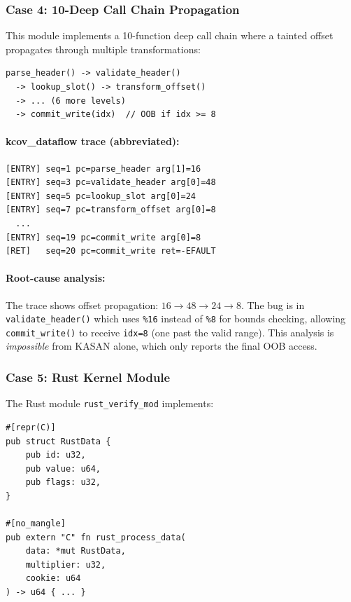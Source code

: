 \documentclass{ndss}
\begin{document}
\subsubsection{Case 4: 10-Deep Call Chain Propagation}

This module implements a 10-function deep call chain where a tainted offset
propagates through multiple transformations:
\begin{lstlisting}[numbers=none]
parse_header() -> validate_header()
  -> lookup_slot() -> transform_offset()
  -> ... (6 more levels)
  -> commit_write(idx)  // OOB if idx >= 8
\end{lstlisting}

\paragraph{kcov\_dataflow trace (abbreviated):}
\begin{lstlisting}[numbers=none]
[ENTRY] seq=1 pc=parse_header arg[1]=16
[ENTRY] seq=3 pc=validate_header arg[0]=48
[ENTRY] seq=5 pc=lookup_slot arg[0]=24
[ENTRY] seq=7 pc=transform_offset arg[0]=8
  ...
[ENTRY] seq=19 pc=commit_write arg[0]=8
[RET]   seq=20 pc=commit_write ret=-EFAULT
\end{lstlisting}

\paragraph{Root-cause analysis:} The trace shows offset propagation:
$16 \to 48 \to 24 \to 8$. The bug is in \texttt{validate\_header()} which
uses \texttt{\%16} instead of \texttt{\%8} for bounds checking, allowing
\texttt{commit\_write()} to receive \texttt{idx=8} (one past the valid range).
This analysis is \emph{impossible} from KASAN alone, which only reports the
final OOB access.

\subsubsection{Case 5: Rust Kernel Module}

The Rust module \texttt{rust\_verify\_mod} implements:
\begin{lstlisting}[numbers=none]
#[repr(C)]
pub struct RustData {
    pub id: u32,
    pub value: u64,
    pub flags: u32,
}

#[no_mangle]
pub extern "C" fn rust_process_data(
    data: *mut RustData,
    multiplier: u32,
    cookie: u64
) -> u64 { ... }
\end{lstlisting}
\end{document}
